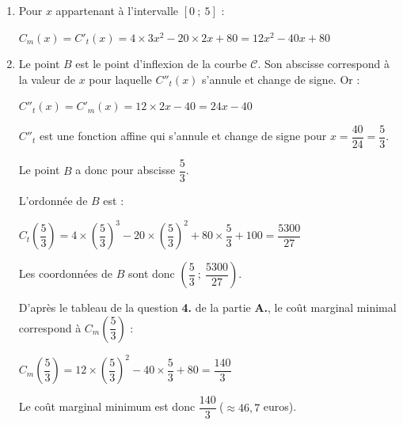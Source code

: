 \begin{corrige}
     \par
     \begin{enumerate}
          \item
          Pour $x$ appartenant à l'intervalle $[0~;~5]$ :
          \par
          $C_m(x)=C'_t(x)=4 \times 3x^2-20 \times 2x + 80 = 12 x^2-40x+ 80$
          \item
          Le point $B$ est le point d'inflexion de la courbe $\mathscr{C}$.
          Son abscisse correspond à la valeur de $x$ pour laquelle $C''_t(x)$ s'annule et change de signe.
          Or :
          \par
          $C''_t(x)=C'_m(x)=12 \times 2x-40=24x-40$
          \par
          $C''_t$ est une fonction affine qui s'annule et change de signe pour ${x=\dfrac{40}{24}=\dfrac{5}{3}}$.
          \par
          Le point $B$ a donc pour abscisse $\dfrac{5}{3}$.
          \par
          L'ordonnée de $B$ est :
          \par
          $C_t\left(\dfrac{5}{3}\right)=4 \times \left(\dfrac{5}{3}\right)^3 - 20 \times \left(\dfrac{5}{3}\right)^2 + 80 \times \dfrac{5}{3} +100 = \dfrac{5300}{27}$
          \par
          Les coordonnées de $B$ sont donc $ \left(\dfrac{5}{3}~;~\dfrac{5300}{27}\right)$.
          \vspace{3mm}
          \par
          D'après le tableau de la question \textbf{4.} de la partie \textbf{A.}, le coût marginal minimal correspond à $C_m\left(\dfrac{5}{3}\right)$ :
          \par
          $C_m\left(\dfrac{5}{3}\right)=12 \times \left(\dfrac{5}{3}\right)^2 - 40 \times \dfrac{5}{3} +80 = \dfrac{140}{3}$
          \par
          Le coût marginal minimum est donc $\dfrac{140}{3}\ $($\approx 46,7$ euros).
          \par
     \end{enumerate}
\end{corrige}
